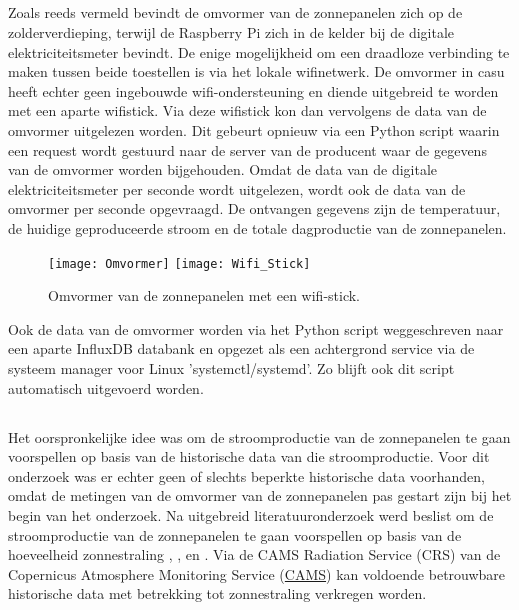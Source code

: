 \subsection{}%
\label{sec:Omvormer zonnepanelen uitlezen}

Zoals reeds vermeld bevindt de omvormer van de zonnepanelen zich op de zolderverdieping, terwijl de Raspberry Pi zich in de kelder bij de digitale elektriciteitsmeter bevindt. De enige mogelijkheid om een draadloze verbinding te maken tussen beide toestellen is via het lokale wifinetwerk. De omvormer in casu heeft echter geen ingebouwde wifi-ondersteuning en diende uitgebreid te worden met een aparte wifistick. Via deze wifistick kon dan vervolgens de data van de omvormer uitgelezen worden. Dit gebeurt opnieuw via een Python script waarin een request wordt gestuurd naar de server van de producent waar de gegevens van de omvormer worden bijgehouden. Omdat de data van de digitale elektriciteitsmeter per seconde wordt uitgelezen, wordt ook de data van de omvormer per seconde opgevraagd. De ontvangen gegevens zijn de temperatuur, de huidige geproduceerde stroom en de totale dagproductie van de zonnepanelen. \\

\begin{figure}[h!]
    \centering
    \texttt{[image: Omvormer]} \hspace{0.5cm}
    \texttt{[image: Wifi\_Stick]}
    \caption{Omvormer van de zonnepanelen met een wifi-stick.}
\end{figure}

Ook de data van de omvormer worden via het Python script weggeschreven naar een aparte InfluxDB databank en opgezet als een achtergrond service via de systeem manager voor Linux 'systemctl/systemd'. Zo blijft ook dit script automatisch uitgevoerd worden.

\subsection{}%
\label{sec:Stroomproductie van zonnepanelen voorspellen met XGBoost}

Het oorspronkelijke idee was om de stroomproductie van de zonnepanelen te gaan voorspellen op basis van de historische data van die stroomproductie. Voor dit onderzoek was er echter geen of slechts beperkte historische data voorhanden, omdat de metingen van de omvormer van de zonnepanelen pas gestart zijn bij het begin van het onderzoek. Na uitgebreid literatuuronderzoek werd beslist om de stroomproductie van de zonnepanelen te gaan voorspellen op basis van de hoeveelheid zonnestraling  \autocite{Sehrawat2023}, \autocite{Ledmaoui2023}, \autocite{Wang2022} en \autocite{Sansine2023}. Via de CAMS Radiation Service (CRS) van de Copernicus Atmosphere Monitoring Service (\href{https://atmosphere.copernicus.eu}{CAMS}) kan voldoende betrouwbare historische data met betrekking tot zonnestraling verkregen worden.

